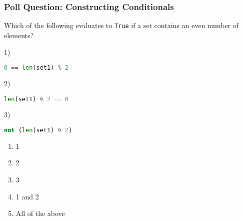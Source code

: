 \documentclass{beamer}
\begin{document}
%
%
\begin{frame}[fragile]
	\frametitle{Poll Question: Constructing Conditionals}
  Which of the following evaluates to \lstinline|True| if a set contains an even number of elements?\\ \hfill

	\begin{minipage}{0.69\textwidth}
    1)
		\begin{lstlisting}[language=Python, autogobble,basicstyle=\tiny,numbers=none]
    0 == len(set1) % 2
		\end{lstlisting}
    \vspace{1cm}
    2)
		\begin{lstlisting}[language=Python, autogobble,basicstyle=\tiny,numbers=none]
    len(set1) % 2 == 0
		\end{lstlisting}
    \vspace{1cm}
    3)
		\begin{lstlisting}[language=Python, autogobble,basicstyle=\tiny,numbers=none]
    not (len(set1) % 2)
		\end{lstlisting}
	\end{minipage}
	\begin{minipage}{0.29\textwidth}
    \begin{enumerate}[A]
      \item 1
      \item 2
      \item 3
      \item 1 and 2
      \item All of the above
    \end{enumerate}
	\end{minipage}
\end{frame}
\end{document}
